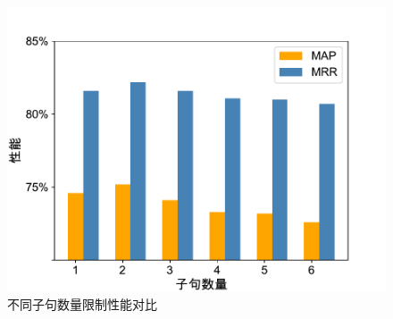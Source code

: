 \begin{figure}[h]
    \centering
      \includegraphics[scale=0.5]{figure/fig3-2.pdf}
    \caption{不同子句数量限制性能对比}
    \label{fig3-2}
\end{figure}